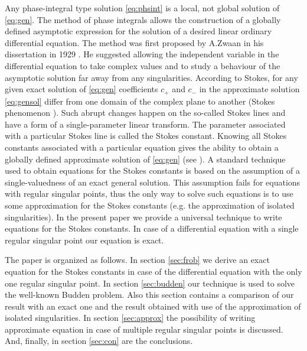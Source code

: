 \documentclass[aip,jmp,reprint]{revtex4-1}
\begin{document}
Any phase-integral type solution \eqref{eq:phsint} is a local, not global solution of \eqref{eq:gen}. 
The method of phase integrals allows the construction of a globally defined 
asymptotic expression for the solution of a desired linear ordinary differential 
equation. The method was first proposed by A.Zwaan in his dissertation in 1929 \cite{zwaan}. 
He suggested allowing the independent variable in the differential equation to take 
complex values and to study a behaviour of the asymptotic solution far away from any 
singularities. According to Stokes\cite{stokes}, for any given exact solution 
of \eqref{eq:gen} coefficients $c_+$ and $c_-$ in the approximate solution \eqref{eq:gensol} 
differ from one domain of the complex plane to another 
(Stokes phenomenon \cite{stokes,rwbook,heading,frbook}). Such abrupt 
changes happen on the so-called Stokes lines and have a form of a single-parameter 
linear transform\cite{heading}. The parameter associated with a particular Stokes line 
is called the Stokes constant. Knowing all Stokes constants associated with a particular 
equation gives the ability to obtain a globally defined approximate solution 
of \eqref{eq:gen} (see ). A standard technique\cite{frpaper} used to obtain
equations for the Stokes constants is based on the assumption of a single-valuedness of
an exact general solution. This assumption fails for equations with regular singular points\cite{cbbook}, thus
the only way to solve such equations is to use some approximation for the Stokes constants\cite{rwbook, ours}
(e.g. the approximation of isolated singularities\cite{rwbook}). In the present paper we provide a universal
technique to write equations for the Stokes constants. In case of a differential equation with
a single regular singular point our equation is exact.

The paper is organized as follows.
In section \ref{sec:frob} we derive an exact equation for the Stokes constants in case of the differential
equation with the only one regular singular point. 
In section \ref{sec:budden} our technique is used to solve the well-known Budden problem. Also this
section contains a comparison of our result with an exact one and the result obtained with use
of the approximation of isolated singularities.
In section \ref{sec:approx} the possibility of writing approximate equation in case of multiple 
regular singular points is discussed.
And, finally, in section \ref{sec:con} are the conclusions. 
\end{document}
